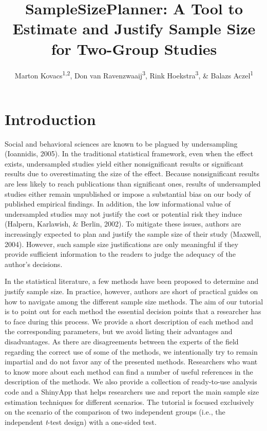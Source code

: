 \documentclass[
  english,
  man,floatsintext]{apa6}
\title{SampleSizePlanner: A Tool to Estimate and Justify Sample Size for Two-Group Studies}
\author{Marton Kovacs\textsuperscript{1,2}, Don van Ravenzwaaij\textsuperscript{3}, Rink Hoekstra\textsuperscript{3}, \& Balazs Aczel\textsuperscript{1}}
\date{}
\affiliation{\vspace{0.5cm}\textsuperscript{1} Institute of Psychology, ELTE Eotvos Lorand University, Budapest, Hungary\\\textsuperscript{2} Doctoral School of Psychology, ELTE Eotvos Lorand University, Budapest, Hungary\\\textsuperscript{3} University of Groningen, Groningen, The Netherlands}
\begin{document}
\maketitle

\hypertarget{introduction}{%
\section{Introduction}\label{introduction}}

Social and behavioral sciences are known to be plagued by undersampling (Ioannidis, 2005). In the traditional statistical framework, even when the effect exists, undersampled studies yield either nonsignificant results or significant results due to overestimating the size of the effect. Because nonsignificant results are less likely to reach publications than significant ones, results of undersampled studies either remain unpublished or impose a substantial bias on our body of published empirical findings. In addition, the low informational value of undersampled studies may not justify the cost or potential risk they induce (Halpern, Karlawish, \& Berlin, 2002). To mitigate these issues, authors are increasingly expected to plan and justify the sample size of their study (Maxwell, 2004). However, such sample size justifications are only meaningful if they provide sufficient information to the readers to judge the adequacy of the author's decisions.

In the statistical literature, a few methods have been proposed to determine and justify sample size. In practice, however, authors are short of practical guides on how to navigate among the different sample size methods. The aim of our tutorial is to point out for each method the essential decision points that a researcher has to face during this process. We provide a short description of each method and the corresponding parameters, but we avoid listing their advantages and disadvantages. As there are disagreements between the experts of the field regarding the correct use of some of the methods, we intentionally try to remain impartial and do not favor any of the presented methods. Researchers who want to know more about each method can find a number of useful references in the description of the methods. We also provide a collection of ready-to-use analysis code and a ShinyApp that helps researchers use and report the main sample size estimation techniques for different scenarios. The tutorial is focused exclusively on the scenario of the comparison of two independent groups (i.e., the independent \emph{t}-test design) with a one-sided test.
\end{document}
